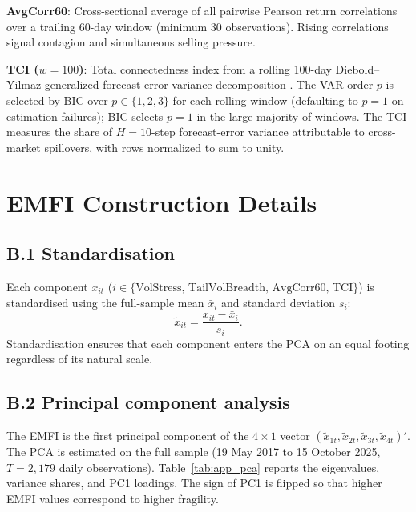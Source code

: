 \documentclass[11pt]{article}
\begin{document}
\textbf{AvgCorr60}: Cross-sectional average of all pairwise Pearson return correlations over a trailing 60-day window (minimum 30 observations). Rising correlations signal contagion and simultaneous selling pressure.

\textbf{TCI ($w=100$)}: Total connectedness index from a rolling 100-day Diebold--Yilmaz generalized forecast-error variance decomposition \citep{dieboldyilmaz2012,pesaranshim1998}. The VAR order $p$ is selected by BIC over $p\in\{1,2,3\}$ for each rolling window (defaulting to $p=1$ on estimation failures); BIC selects $p=1$ in the large majority of windows. The TCI measures the share of $H=10$-step forecast-error variance attributable to cross-market spillovers, with rows normalized to sum to unity.

\section{EMFI Construction Details}
\label{app:emfi}

\subsection*{B.1 Standardisation}

Each component $x_{it}$ ($i \in \{\text{VolStress, TailVolBreadth, AvgCorr60, TCI}\}$) is standardised using the full-sample mean $\bar{x}_i$ and standard deviation $s_i$:
\[
\tilde{x}_{it} = \frac{x_{it} - \bar{x}_i}{s_i}.
\]
Standardisation ensures that each component enters the PCA on an equal footing regardless of its natural scale.

\subsection*{B.2 Principal component analysis}

The EMFI is the first principal component of the $4 \times 1$ vector $(\tilde{x}_{1t}, \tilde{x}_{2t}, \tilde{x}_{3t}, \tilde{x}_{4t})'$. The PCA is estimated on the full sample (19 May 2017 to 15 October 2025, $T = 2{,}179$ daily observations). Table~\ref{tab:app_pca} reports the eigenvalues, variance shares, and PC1 loadings. The sign of PC1 is flipped so that higher EMFI values correspond to higher fragility.
\end{document}
